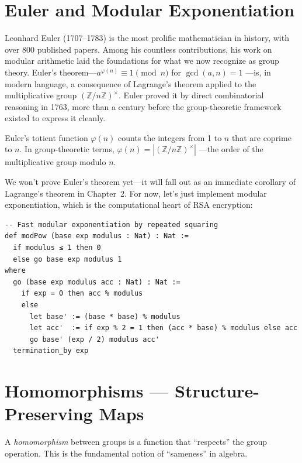 \documentclass[11pt, a4paper, oneside]{book}
\newcommand{\Z}{\mathbb{Z}}
\begin{document}
\section{Euler and Modular Exponentiation}

\begin{historical}[title={Euler's Theorem}]
Leonhard Euler (1707--1783) is the most prolific mathematician in history,
with over 800 published papers. Among his countless contributions, his work
on modular arithmetic laid the foundations for what we now recognize as group
theory. Euler's theorem---$a^{\varphi(n)} \equiv 1 \pmod{n}$ for $\gcd(a,n)=1$%
---is, in modern language, a consequence of Lagrange's theorem applied to the
multiplicative group $(\Z/n\Z)^\times$. Euler proved it by direct combinatorial
reasoning in 1763, more than a century before the group-theoretic framework
existed to express it cleanly.

Euler's totient function $\varphi(n)$ counts the integers from 1 to $n$ that
are coprime to $n$. In group-theoretic terms, $\varphi(n) = |(\Z/n\Z)^\times|$%
---the order of the multiplicative group modulo $n$.
\end{historical}

We won't prove Euler's theorem yet---it will fall out as an immediate
corollary of Lagrange's theorem in Chapter~2. For now, let's just implement
modular exponentiation, which is the computational heart of RSA encryption:

\begin{leanbox}
\begin{verbatim}
-- Fast modular exponentiation by repeated squaring
def modPow (base exp modulus : Nat) : Nat :=
  if modulus ≤ 1 then 0
  else go base exp modulus 1
where
  go (base exp modulus acc : Nat) : Nat :=
    if exp = 0 then acc % modulus
    else
      let base' := (base * base) % modulus
      let acc'  := if exp % 2 = 1 then (acc * base) % modulus else acc
      go base' (exp / 2) modulus acc'
  termination_by exp
\end{verbatim}
\end{leanbox}

\section{Homomorphisms --- Structure-Preserving Maps}

A \emph{homomorphism} between groups is a function that ``respects'' the group
operation. This is the fundamental notion of ``sameness'' in algebra.
\end{document}
